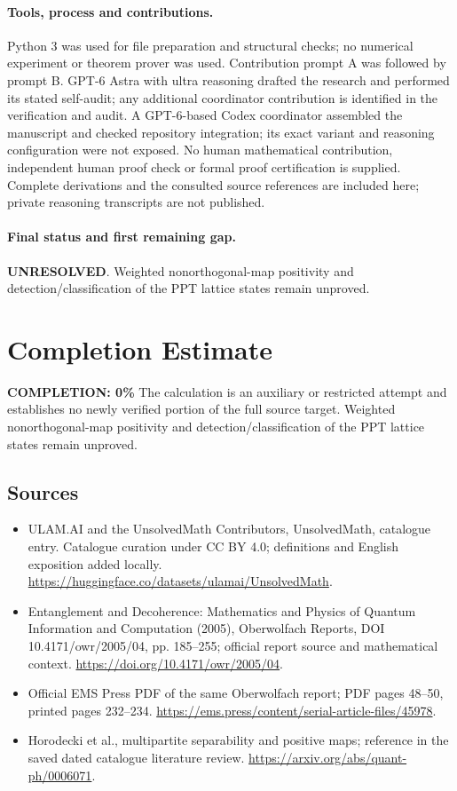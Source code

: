 \documentclass[11pt]{article}
\begin{document}
\paragraph{Tools, process and contributions.}
Python 3 was used for file preparation and structural checks; no numerical experiment or theorem prover was used. Contribution prompt A was followed by prompt B. GPT-6 Astra with ultra reasoning drafted the research and performed its stated self-audit; any additional coordinator contribution is identified in the verification and audit. A GPT-6-based Codex coordinator assembled the manuscript and checked repository integration; its exact variant and reasoning configuration were not exposed. No human mathematical contribution, independent human proof check or formal proof certification is supplied. Complete derivations and the consulted source references are included here; private reasoning transcripts are not published.

\paragraph{Final status and first remaining gap.}
\textbf{UNRESOLVED}. Weighted nonorthogonal-map positivity and detection/classification of the PPT lattice states remain unproved.

\section{Completion Estimate}
\noindent\textbf{COMPLETION: 0\%}
The calculation is an auxiliary or restricted attempt and establishes no newly verified portion of the full source target. Weighted nonorthogonal-map positivity and detection/classification of the PPT lattice states remain unproved.

\subsection{Sources}
\begin{itemize}
\item[\hypertarget{source:statement:1}{S1}] ULAM.AI and the UnsolvedMath Contributors, UnsolvedMath, catalogue entry. Catalogue curation under CC BY 4.0; definitions and English exposition added locally.
\url{https://huggingface.co/datasets/ulamai/UnsolvedMath}.
\item[\hypertarget{source:statement:2}{S2}] Entanglement and Decoherence: Mathematics and Physics of Quantum Information and Computation (2005), Oberwolfach Reports, DOI 10.4171/owr/2005/04, pp. 185--255; official report source and mathematical context.
\url{https://doi.org/10.4171/owr/2005/04}.
\item[\hypertarget{source:statement:3}{S3}] Official EMS Press PDF of the same Oberwolfach report; PDF pages 48--50, printed pages 232--234.
\url{https://ems.press/content/serial-article-files/45978}.
\item[\hypertarget{source:statement:4}{S4}] Horodecki et al., multipartite separability and positive maps; reference in the saved dated catalogue literature review.
\url{https://arxiv.org/abs/quant-ph/0006071}.
\end{itemize}
\label{end:statement}
\end{document}
